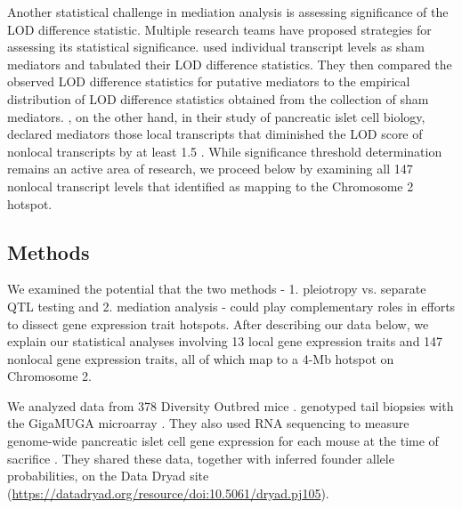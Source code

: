 \documentclass[oneside]{book}
\begin{document}

Another statistical challenge in mediation analysis is assessing significance of the LOD difference statistic. Multiple research teams have proposed strategies for assessing its statistical significance. \citet{chick2016defining} used individual transcript levels as sham mediators and tabulated their LOD difference statistics. They then compared the observed LOD difference statistics for putative mediators to the empirical distribution of LOD difference statistics obtained from the collection of sham mediators. \citet{keller2018genetic}, on the other hand, in their study of pancreatic islet cell biology, declared mediators those local transcripts that diminished the LOD score of nonlocal transcripts by at least 1.5 \citep{keller2018genetic}. While significance threshold determination remains an active area of research, we proceed below by examining all 147 nonlocal transcript levels that \citet{keller2018genetic} identified as mapping to the Chromosome 2 hotspot.



\subsection{Methods}

We examined the potential that the two methods - 1. pleiotropy vs. separate QTL testing and 2. mediation analysis - could play complementary roles in efforts to dissect gene expression trait hotspots. After describing our data below, we explain our statistical analyses involving 13 local gene expression traits and 147 nonlocal gene expression traits, all of which map to a 4-Mb hotspot on Chromosome 2.


We analyzed data from 378 Diversity Outbred mice \citep{keller2018genetic}. \citet{keller2018genetic} genotyped tail biopsies with the GigaMUGA microarray \citep{morgan2015mouse}. They also used RNA sequencing to measure genome-wide pancreatic islet cell gene expression for each mouse at the time of sacrifice \citep{keller2018genetic}. They shared these data, together with inferred founder allele probabilities, on the Data Dryad site (\url{https://datadryad.org/resource/doi:10.5061/dryad.pj105}).
\end{document}
